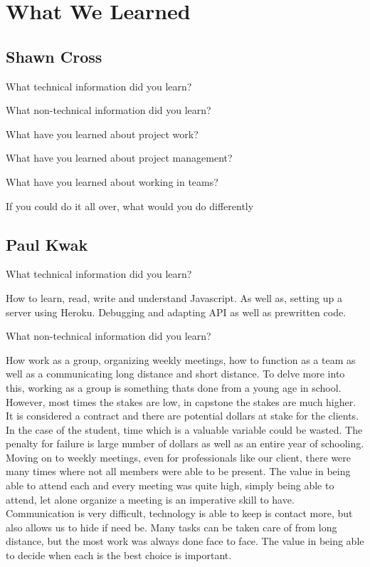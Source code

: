 \documentclass[letterpaper, 10pt, draftclsnofoot, compsoc, onecolumn]{IEEEtran}
\begin{document}
\section{What We Learned}
\subsection{Shawn Cross}
What technical information did you learn?

What non-technical information did you learn?

What have you learned about project work?

What have you learned about project management?

What have you learned about working in teams?

If you could do it all over, what would you do differently

\subsection{Paul Kwak}
What technical information did you learn?

How to learn, read, write and understand Javascript. As well as, setting up a server using Heroku. Debugging and adapting API as well as prewritten code.

What non-technical information did you learn?

How work as a group, organizing weekly meetings, how to function as a team as well as a communicating long distance and short distance. To delve more into this, working as a group is something thats done from a young age in school. However, most times the stakes are low, in capstone the stakes are much higher. It is considered a contract and there are potential dollars at stake for the clients. In the case of the student, time which is a valuable variable could be wasted. The penalty for failure is large number of dollars as well as an entire year of schooling. Moving on to weekly meetings, even for professionals like our client, there were many times where not all members were able to be present. The value in being able to attend each and every meeting was quite high, simply being able to attend, let alone organize a meeting is an imperative skill to have. Communication is very difficult, technology is able to keep is contact more, but also allows us to hide if need be. Many tasks can be taken care of from long distance, but the most work was always done face to face. The value in being able to decide when each is the best choice is important.
\end{document}
